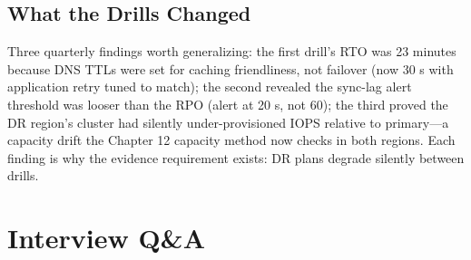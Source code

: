 \subsection{What the Drills Changed}
Three quarterly findings worth generalizing: the first drill's RTO was 23 minutes because DNS TTLs were set for caching friendliness, not failover (now 30 s with application retry tuned to match); the second revealed the sync-lag alert threshold was looser than the RPO (alert at 20 s, not 60); the third proved the DR region's cluster had silently under-provisioned IOPS relative to primary---a capacity drift the Chapter 12 capacity method now checks in both regions. Each finding is why the evidence requirement exists: DR plans degrade silently between drills.

\section{Interview Q\&A}
